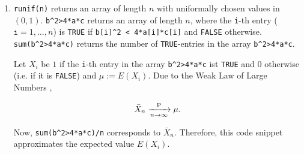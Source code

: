 \begin{solution}
\begin{enumerate}[label = (\alph*)]
\begin{enumerate}[label = \arabic*.]
    \end{enumerate}

    \item \verb|runif(n)| returns an array of length $n$ with uniformally chosen values in $(0, 1)$.
    \verb|b^2>4*a*c| returns an array of length $n$, where the \texttt{i}-th entry ($\texttt{i} = 1, \dots, n$) is \texttt{TRUE} if \verb|b[i]^2 < 4*a[i]*c[i]| and \texttt{FALSE} otherwise.
    \verb|sum(b^2>4*a*c)| returns the number of \texttt{TRUE}-entries in the array \verb|b^2>4*a*c|.

    Let $X_i$ be $1$ if the \texttt{i}-th entry in the array \verb|b^2>4*a*c| ist \texttt{TRUE} and $0$ otherwise (i.e. if it is \texttt{FALSE}) and $\mu := E(X_i)$.
    Due to the Weak Law of Large Numbers \cite[Lecture 4, Slide 52]{EStat},

    \begin{align*}
        \bar X_n \xrightarrow[n \to \infty]{\text P} \mu.
    \end{align*}

    Now, \verb|sum(b^2>4*a*c)/n| corresponds to $\bar X_n$.
    Therefore, this code snippet approximates the expected value $E(X_i)$.

\end{enumerate}

\end{solution}

